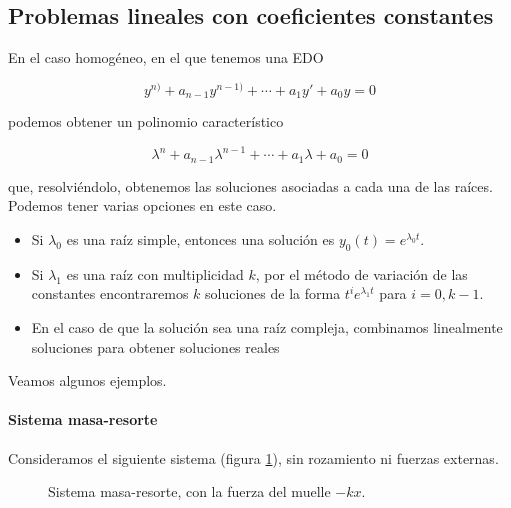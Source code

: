 \documentclass[nochap]{apuntes}
\begin{document}
\subsection{Problemas lineales con coeficientes constantes}
\label{secEcHomoLinealConstante}
En el caso homogéneo, en el que tenemos una EDO

\[ y^{n)} + a_{n-1}y^{n-1)} + \dotsb + a_1y' + a_0 y = 0 \]

podemos obtener un polinomio característico 

\[ λ^n + a_{n-1}λ^{n-1} + \dotsb + a_1λ + a_0 = 0 \]

que, resolviéndolo, obtenemos las soluciones asociadas a cada una de las raíces. Podemos tener varias opciones en este caso. 

\begin{itemize}
\item Si $λ_0$ es una raíz simple, entonces una solución es $y_0(t) = e^{λ_0t}$.
\item Si $λ_1$ es una raíz con multiplicidad $k$, por el método de variación de las constantes encontraremos $k$ soluciones de la forma $t^ie^{λ_1t}$ para $i=0,k-1$.
\item En el caso de que la solución sea una raíz compleja, combinamos linealmente soluciones para obtener soluciones reales 
\end{itemize}

Veamos algunos ejemplos.

\paragraph{Sistema masa-resorte}

Consideramos el siguiente sistema (figura \ref{imgMasaResorte1}), sin rozamiento ni fuerzas externas.

\begin{figure}[hbtp]
\centering
{}
\caption{Sistema masa-resorte, con la fuerza del muelle $-kx$.}
\label{imgMasaResorte1}
\end{figure}
\end{document}
